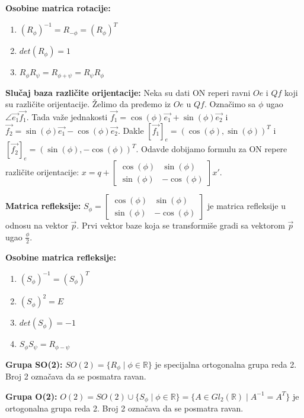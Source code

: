 \documentclass[12pt]{article}
\newcommand{\vek}[1]{\overrightarrow{#1}}
\begin{document}
\textbf{Osobine matrica rotacije:}
\begin{enumerate}[label=\textbf{(\arabic*)}]
    \item $(R_\phi)^{-1}=R_{-\phi}=(R_\phi)^T$
    \item $det(R_\phi)=1$
    \item $R_\phi R_\psi=R_{\phi+\psi}=R_\psi R_\phi$
\end{enumerate}
\par

\textbf{Slučaj baza različite orijentacije:} Neka su dati ON reperi ravni $Oe$
i $Qf$ koji su različite orijentacije. Želimo da pređemo iz $Oe$ u $Qf$.
Označimo sa $\phi$ ugao $\angle{\vek{e_1}\vek{f_1}}$. Tada važe jednakosti
$\vek{f_1}=\cos(\phi)\vek{e_1}+\sin(\phi)\vek{e_2}$ i
$\vek{f_2}=\sin(\phi)\vek{e_1}-\cos(\phi)\vek{e_2}$. Dakle
$[\vek{f_1}]_e=(\cos(\phi),\sin(\phi))^T$ i
$[\vek{f_2}]_e=(\sin(\phi),-\cos(\phi))^T$.
Odavde dobijamo formulu za ON repere različite orijentacije:
$x=q+\begin{bmatrix}
        \cos(\phi) & \sin(\phi)  \\
        \sin(\phi) & -\cos(\phi)
    \end{bmatrix} x'$.
\par

\textbf{Matrica refleksije:} $S_\phi=\begin{bmatrix}
        \cos(\phi) & \sin(\phi)  \\
        \sin(\phi) & -\cos(\phi)
    \end{bmatrix}$ je matrica refleksije u odnosu na vektor $\vek{p}$.
Prvi vektor baze koja se transformiše gradi sa vektorom $\vek{p}$ ugao
$\frac{\phi}{2}$.
\par

\textbf{Osobine matrica refleksije:}
\begin{enumerate}[label=\textbf{(\arabic*)}]
    \item $(S_\phi)^{-1}=(S_\phi)^T$
    \item $(S_\phi)^{2}=E$
    \item $det(S_\phi)=-1$
    \item $S_\phi S_\psi=R_{\phi-\psi}$
\end{enumerate}
\par

\textbf{Grupa SO(2):} $SO(2)=\{R_\phi\mid\phi\in\mathbb{R}\}$ je specijalna
ortogonalna grupa reda 2. Broj 2 označava da se posmatra ravan.
\par

\textbf{Grupa O(2):}
$O(2)=SO(2)\cup\{S_\phi\mid\phi\in\mathbb{R}\}=\{A\in
    Gl_2(\mathbb{R})\mid A^{-1}=A^T\}$
je ortogonalna grupa reda 2. Broj 2 označava da se posmatra ravan.
\end{document}
